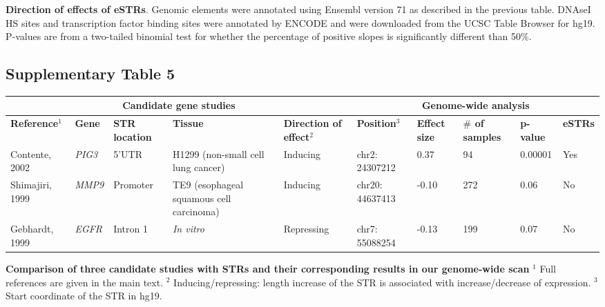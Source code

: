 \textbf{Direction of effects of eSTRs}. Genomic elements were annotated using Ensembl version 71 as described in the previous table. DNAseI HS sites and transcription factor binding sites were annotated by ENCODE and were downloaded from the UCSC Table Browser for hg19.
P-values are from a two-tailed binomial test for whether the percentage of positive slopes is significantly different than 50\%.

\pagebreak
\subsection{Supplementary Table 5}
\label{tab:estrsuptab5}
\setlength\extrarowheight{2pt}
\begin{table}[h!]
\footnotesize
\begin{tabular}{|p{1.4cm}|l|p{1.2cm}|p{1.8cm}|p{1.5cm}|p{1.3cm}|p{0.8cm}|p{1.0cm}|l|l|}
\hline
\multicolumn{5}{|c|}{\textbf{Candidate gene studies}}  & \multicolumn{5}{|c|}{\textbf{Genome-wide analysis}}\\
\hline
\textbf{Reference}$^1$      & \textbf{Gene} & \textbf{STR location} & \textbf{Tissue}                               & \textbf{Direction of effect}$^2$ & \textbf{Position}$^3$   & \textbf{Effect size} &   \textbf{$\#$ of samples} & \textbf{p-value} & \textbf{eSTRs}\\
\hline
Contente, 2002    & \emph{PIG3} & 5'UTR   &  H1299 (non-small cell lung cancer)      & Inducing                & chr2: 24307212  & 0.37        & 94                & 0.00001     & Yes \\\hline
Shimajiri, 1999   & \emph{MMP9} & Promoter&  TE9 (esophageal squamous cell carcinoma)  & Inducing              & chr20: 44637413 & -0.10       & 272               & 0.06        & No\\\hline
Gebhardt, 1999    & \emph{EGFR} & Intron 1&  \emph{In vitro}								   & Repressing              & chr7: 55088254  & -0.13       & 199               & 0.07       & No\\ \hline

\end{tabular}
\end{table}


\textbf{Comparison of three candidate studies with STRs and their corresponding results in our genome-wide scan}
\newline
{
\footnotesize
$^1$ Full references are given in the main text.\newline
$^2$ Inducing/repressing: length increase of the STR is associated with increase/decrease of expression.\newline
$^3$ Start coordinate of the STR in hg19.\newline
}



